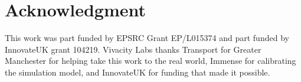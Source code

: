 \documentclass[conference]{IEEEtran}
\begin{document}
%




\section*{Acknowledgment}
This work was part funded by EPSRC Grant EP/L015374 and part funded by InnovateUK grant 104219. 
Vivacity Labs thanks Transport for Greater Manchester for helping take this work to the real world, Immense for calibrating the simulation model, and InnovateUK for funding that made it possible.



%
%
%
  
\end{document}
